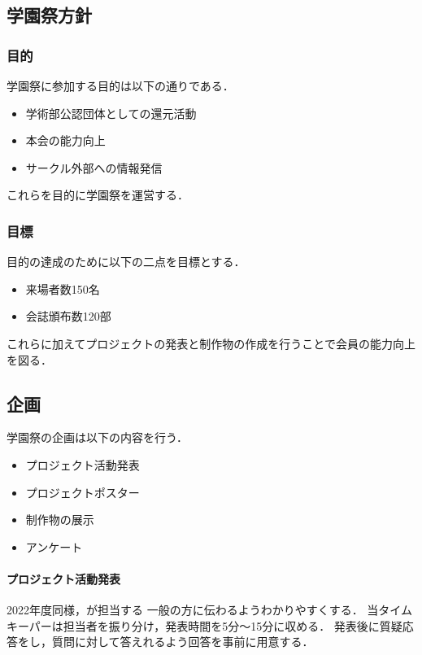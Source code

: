 \subsection*{学園祭方針}


\subsubsection*{目的}
学園祭に参加する目的は以下の通りである．
\begin{itemize}
    \item 学術部公認団体としての還元活動
    \item 本会の能力向上
    \item サークル外部への情報発信
\end{itemize}
これらを目的に学園祭を運営する．

\subsubsection*{目標}
目的の達成のために以下の二点を目標とする．
\begin{itemize}
    \item 来場者数150名
    \item 会誌頒布数120部
\end{itemize}
これらに加えてプロジェクトの発表と制作物の作成を行うことで会員の能力向上を図る．

\subsection*{企画}
学園祭の企画は以下の内容を行う．
\begin{itemize}
    \item プロジェクト活動発表
    \item プロジェクトポスター
    \item 制作物の展示
    \item アンケート
\end{itemize}

\paragraph{プロジェクト活動発表}
2022年度同様\firstGrade{}，\secondGrade{}が担当する
一般の方に伝わるようわかりやすくする．
当タイムキーパーは担当者を振り分け，発表時間を5分～15分に収める．
発表後に質疑応答をし，質問に対して答えれるよう回答を事前に用意する．  

